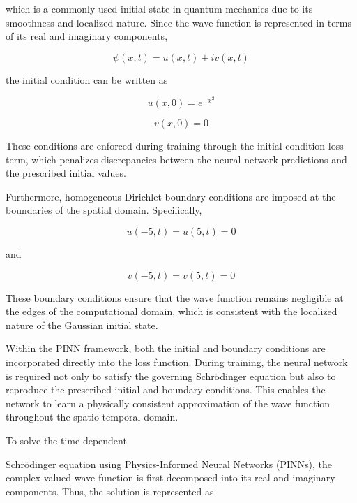 \documentclass[11pt]{article}
\begin{document}
which is a commonly used initial state in quantum mechanics 
due to its smoothness and localized nature. Since the wave 
function is represented in terms of its real and imaginary 
components,

\begin{equation}
    \psi(x,t)=u(x,t)+iv(x,t)
\end{equation}

the initial condition can be written as

\begin{equation}
    u(x,0)=e^{-x^2}
\end{equation}


\begin{equation}
    v(x,0)=0
\end{equation}

These conditions are enforced during training through the initial-condition 
loss term, which penalizes discrepancies between the 
neural network predictions and the prescribed initial values.

Furthermore, homogeneous Dirichlet boundary conditions are 
imposed at the boundaries of the spatial domain. 
Specifically,

\begin{equation}
    u(-5,t)=u(5,t)=0
\end{equation}

and

\begin{equation}
    v(-5,t)=v(5,t)=0
\end{equation}


These boundary conditions ensure that the wave function 
remains negligible at the edges of the computational domain, 
which is consistent with the localized nature of the 
Gaussian initial state.

Within the PINN framework, 
both the initial and boundary conditions are 
incorporated directly into the loss function. 
During training, the neural network is required not 
only to satisfy the governing Schrödinger equation but 
also to reproduce the prescribed initial and boundary 
conditions. This enables the network to learn a physically 
consistent approximation of the wave function throughout 
the spatio-temporal domain.



To solve the time-dependent 


Schrödinger equation using Physics-Informed 
Neural Networks (PINNs), 
the complex-valued wave function is first decomposed into its real and imaginary components. 
Thus, the solution is represented as
\end{document}
